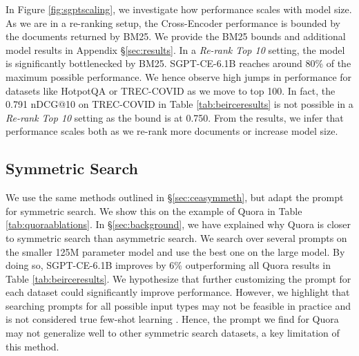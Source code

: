 \documentclass{article}
\begin{document}
In Figure \ref{fig:sgptscaling}, we investigate how performance scales with model size. As we are in a re-ranking setup, the Cross-Encoder performance is bounded by the documents returned by BM25. We provide the BM25 bounds and additional model results in  Appendix \S\ref{sec:results}. In a \textit{Re-rank Top 10} setting, the model is significantly bottlenecked by BM25. SGPT-CE-6.1B reaches around 80\% of the maximum possible performance. We hence observe high jumps in performance for datasets like HotpotQA \cite{yang2018hotpotqa} or TREC-COVID \cite{voorhees2021trec} as we move to top 100. In fact, the 0.791 nDCG@10 on TREC-COVID in Table \ref{tab:beirceresults} is not possible in a \textit{Re-rank Top 10} setting as the bound is at 0.750. From the results, we infer that performance scales both as we re-rank more documents or increase model size.

\subsection{Symmetric Search}\label{sec:cesym}

We use the same methods outlined in \S\ref{sec:ceasymmeth}, but adapt the prompt for symmetric search. We show this on the example of Quora in Table \ref{tab:quoraablations}. In \S\ref{sec:background}, we have explained why Quora is closer to symmetric search than asymmetric search. We search over several prompts on the smaller 125M parameter model and use the best one on the large model. By doing so, SGPT-CE-6.1B improves by 6\% outperforming all Quora results in Table \ref{tab:beirceresults}. We hypothesize that further customizing the prompt for each dataset could significantly improve performance. However, we highlight that searching prompts for all possible input types may not be feasible in practice and is not considered true few-shot learning \cite{perez2021true}. Hence, the prompt we find for Quora may not generalize well to other symmetric search datasets, a key limitation of this method.
\end{document}
